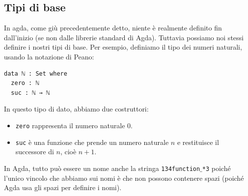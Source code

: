 \documentclass[a4paper]{article}
\theoremstyle{definition}
\theoremstyle{remark}
\begin{document}
\subsection{Tipi di base}

In agda, come giù precedentemente detto, niente è realmente definito fin dall'inizio (se non dalle librerie
standard di Agda). Tuttavia possiamo noi stessi definire i nostri tipi di base.
Per esempio, definiamo il tipo dei numeri naturali, usando la notazione di Peano:

\begin{verbatim}
data ℕ : Set where
  zero : ℕ
  suc : ℕ → ℕ 
\end{verbatim}
In questo tipo di dato, abbiamo due costruttori:
\begin{itemize}
  \item \texttt{zero} rappresenta il numero naturale 0.
  \item \texttt{suc} è una funzione che prende un numero naturale \( n \) e restituisce il successore di \( n \), cioè \( n + 1 \).
\end{itemize} 


\begin{Observation}{}{}{}
  In Agda, tutto può essere un nome anche la stringa \texttt{134function$\_$*3} poiché l'unico
vincolo che abbiamo sui nomi è che non possono contenere spazi (poiché Agda usa gli spazi per definire i nomi).
\end{Observation}
\end{document}
